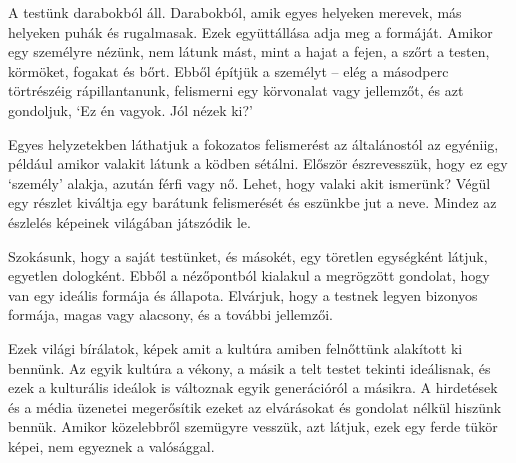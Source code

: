 A testünk darabokból áll. Darabokból, amik egyes helyeken merevek, más
helyeken puhák és rugalmasak. Ezek együttállása adja meg a formáját.
Amikor egy személyre nézünk, nem látunk mást, mint a hajat a fejen, a
szőrt a testen, körmöket, fogakat és bőrt. Ebből építjük a személyt --
elég a másodperc törtrészéig rápillantanunk, felismerni egy körvonalat
vagy jellemzőt, és azt gondoljuk, `Ez én vagyok. Jól nézek ki?'

Egyes helyzetekben láthatjuk a fokozatos felismerést az általánostól az
egyéniig, például amikor valakit látunk a ködben sétálni. Először
észrevesszük, hogy ez egy `személy' alakja, azután férfi vagy nő. Lehet,
hogy valaki akit ismerünk? Végül egy részlet kiváltja egy barátunk
felismerését és eszünkbe jut a neve. Mindez az észlelés képeinek
világában játszódik le.

Szokásunk, hogy a saját testünket, és másokét, egy töretlen egységként
látjuk, egyetlen dologként. Ebből a nézőpontból kialakul a megrögzött
gondolat, hogy van egy ideális formája és állapota. Elvárjuk, hogy a
testnek legyen bizonyos formája, magas vagy alacsony, és a további
jellemzői.

Ezek világi bírálatok, képek amit a kultúra amiben felnőttünk alakított
ki bennünk. Az egyik kultúra a vékony, a másik a telt testet tekinti
ideálisnak, és ezek a kulturális ideálok is változnak egyik generációról
a másikra. A hirdetések és a média üzenetei megerősítik ezeket az
elvárásokat és gondolat nélkül hiszünk bennük. Amikor közelebbről
szemügyre vesszük, azt látjuk, ezek egy ferde tükör képei, nem egyeznek
a valósággal.

\clearpage
\figurepagelayout

